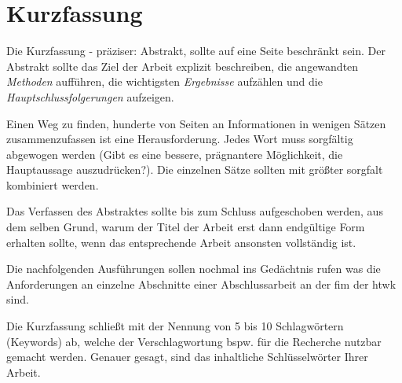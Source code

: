 

\clearpage
\chapter*{Kurzfassung}
Die Kurzfassung - präziser: Abstrakt, sollte auf eine Seite beschränkt sein. Der Abstrakt
sollte das Ziel der Arbeit explizit beschreiben, die angewandten \textit{Methoden} aufführen, die
wichtigsten \textit{Ergebnisse} aufzählen und die \textit{Hauptschlussfolgerungen} aufzeigen.

Einen Weg zu finden, hunderte von Seiten an Informationen in wenigen Sätzen zusammenzufassen
ist eine Herausforderung. Jedes Wort muss sorgfältig abgewogen werden
(Gibt es eine bessere, prägnantere Möglichkeit, die Hauptaussage auszudrücken?). Die
einzelnen Sätze sollten mit größter sorgfalt kombiniert werden.

Das Verfassen des Abstraktes sollte bis zum Schluss aufgeschoben werden, aus dem
selben Grund, warum der Titel der Arbeit erst dann endgültige Form erhalten sollte,
wenn das entsprechende Arbeit ansonsten vollständig ist.

Die nachfolgenden Ausführungen sollen nochmal ins Gedächtnis rufen was die Anforderungen an einzelne Abschnitte einer Abschlussarbeit
an der \ac{fim} der \ac{htwk} sind.

Die Kurzfassung schließt mit der Nennung von 5 bis 10 Schlagwörtern (Keywords) ab,
welche der Verschlagwortung bspw. für die Recherche nutzbar gemacht werden. Genauer gesagt, sind das inhaltliche Schlüsselwörter Ihrer Arbeit.\\\\
